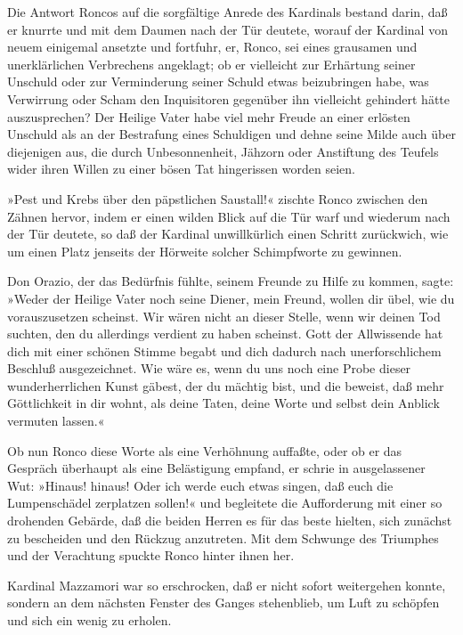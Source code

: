 \pagenum{[69]} Die Antwort Roncos auf die sorgfältige Anrede des
Kardinals bestand darin, daß er knurrte und mit dem Daumen nach der
Tür deutete, worauf der Kardinal von neuem einigemal ansetzte und
fortfuhr, er, Ronco, sei eines grausamen und unerklärlichen
Verbrechens angeklagt; ob er vielleicht zur Erhärtung seiner
Unschuld oder zur Verminderung seiner Schuld etwas beizubringen
habe, was Verwirrung oder Scham den Inquisitoren gegenüber ihn
vielleicht gehindert hätte auszusprechen? Der Heilige Vater habe
viel mehr Freude an einer erlösten Unschuld als an der Bestrafung
eines Schuldigen und dehne seine Milde auch über diejenigen aus,
die durch Unbesonnenheit, Jähzorn oder Anstiftung des Teufels wider
ihren Willen zu einer bösen Tat hingerissen worden seien.

»Pest und Krebs über den päpstlichen Saustall!« zischte Ronco
zwischen den Zähnen hervor, indem er einen wilden Blick auf die Tür
warf und wiederum nach der Tür deutete, so daß der Kardinal
unwillkürlich einen Schritt zurückwich, wie um einen Platz jenseits
der Hörweite solcher Schimpfworte zu gewinnen.

Don Orazio, der das Bedürfnis fühlte, seinem Freunde zu Hilfe zu
kommen, sagte: »Weder der Heilige Vater noch seine Diener, mein
Freund, wollen dir übel, wie du vorauszusetzen scheinst. Wir wären
nicht an dieser Stelle, wenn wir deinen Tod suchten, den du
allerdings verdient zu haben scheinst. Gott der Allwissende hat
dich mit einer schönen Stimme begabt und dich dadurch nach
unerforschlichem Beschluß ausgezeichnet. Wie wäre es, wenn du uns
noch eine Probe dieser wunderherrlichen Kunst gäbest, der du
mächtig bist, und die beweist, daß mehr Göttlichkeit in dir wohnt,
als deine Taten, deine Worte und selbst dein Anblick vermuten
lassen.«

\pagenum{[70]} Ob nun Ronco diese Worte als eine Verhöhnung
auffaßte, oder ob er das Gespräch überhaupt als eine Belästigung
empfand, er schrie in ausgelassener Wut: »Hinaus! hinaus! Oder ich
werde euch etwas singen, daß euch die Lumpenschädel zerplatzen
sollen!« und begleitete die Aufforderung mit einer so drohenden
Gebärde, daß die beiden Herren es für das beste hielten, sich
zunächst zu bescheiden und den Rückzug anzutreten. Mit dem Schwunge
des Triumphes und der Verachtung spuckte Ronco hinter ihnen her.

Kardinal Mazzamori war so erschrocken, daß er nicht sofort
weitergehen konnte, sondern an dem nächsten Fenster des Ganges
stehenblieb, um Luft zu schöpfen und sich ein wenig zu erholen.

